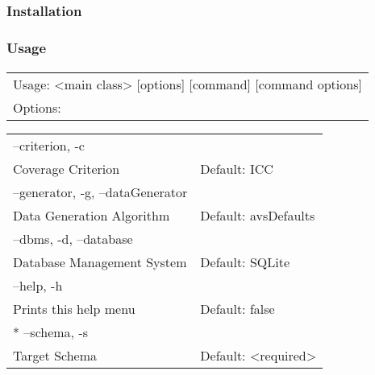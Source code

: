  \begin{frame}
	 \frametitle{Installation}
        \framesubtitle{\mbox{}}
        \centering
	\begin{enumerate}
	\end{enumerate}
 \end{frame}

 \begin{frame}%
        \frametitle{Usage}
        \framesubtitle{\mbox{}}
        \centering
	\begin{tabular}{l}
		\hspace{-1em} Usage: <main class> [options] [command] [command options] \\
  Options: \\
  \end{tabular}
  \begin{tabular}{ll}
   \hspace{1em} --criterion, -c\\
     \hspace{2em}  Coverage Criterion & Default: ICC\\
   \hspace{1em} --generator, -g, --dataGenerator\\
     \hspace{2em}  Data Generation Algorithm & Default: avsDefaults\\
  \hspace{1em}  --dbms, -d, --database\\
  \hspace{2em}    Database Management System & Default: SQLite\\
   \hspace{1em} --help, -h\\
   \hspace{2em}    Prints this help menu & Default: false\\
\hspace{1em}  * --schema, -s\\
\hspace{2em}     Target Schema & Default: <required>
	\end{tabular}
\end{frame}
